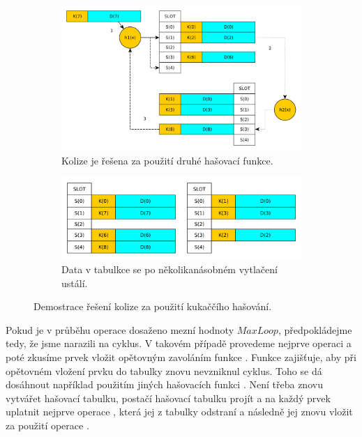 \begin{figure}[!ht]
	\centering
	\begin{subfigure}[b]{0.53\textwidth}
		\includegraphics[width=\textwidth]{fig/cuckoo_hashing_insert}
		\caption{Kolize je řešena za použití druhé hašovací funkce.}
	\end{subfigure}
	\begin{subfigure}[b]{0.46\textwidth}
		\includegraphics[width=\textwidth]{fig/cuckoo_hashing_insert_result}
		\caption{Data v tabulkce se po několikanásobném vytlačení ustálí.}
	\end{subfigure}
	\caption{Demostrace řešení kolize za použití kukaččího hašování.}
	\label{fig:cuckoo_hashing}
\end{figure}

Pokud je v průběhu operace  dosaženo mezní hodnoty $MaxLoop$, předpokládejme tedy, že jsme narazili na cyklus. V takovém případě 
provedeme nejprve operaci  a poté zkusíme prvek vložit opětovným zavoláním funkce .
Funkce  zajišťuje, aby při opětovném vložení prvku do tabulky znovu nevzniknul cyklus. Toho se dá
dosáhnout například použitím jiných hašovacích funkci \cite{Cuckoo_hashing}. Není třeba znovu vytvářet hašovací tabulku,
postačí hašovací tabulku projít a na každý prvek uplatnit nejprve operace , která jej z tabulky odstraní 
a následně jej znovu vložit za použití operace .

